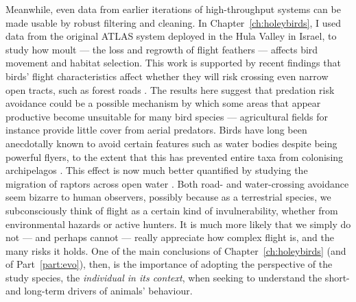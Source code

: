 Meanwhile, even data from earlier iterations of high-throughput systems can be made usable by robust filtering and cleaning.
In Chapter~\ref{ch:holeybirds}, I used data from the original ATLAS system deployed in the Hula Valley in Israel, to study how moult --- the loss and regrowth of flight feathers --- affects bird movement and habitat selection.
This work is supported by recent findings that birds' flight characteristics affect whether they will risk crossing even narrow open tracts, such as forest roads \citep{claramunt2022}.
The results here suggest that predation risk avoidance could be a possible mechanism by which some areas that appear productive become unsuitable for many bird species --- agricultural fields for instance provide little cover from aerial predators.
Birds have long been anecdotally known to avoid certain features such as water bodies despite being powerful flyers, to the extent that this has prevented entire taxa from colonising archipelagos \citep{diamond1981}.
This effect is now much better quantified by studying the migration of raptors across open water \citep{nourani2020}.
Both road- and water-crossing avoidance seem bizarre to human observers, possibly because as a terrestrial species, we subconsciously think of flight as a certain kind of invulnerability, whether from environmental hazards or active hunters.
It is much more likely that we simply do not --- and perhaps cannot --- really appreciate how complex flight is, and the many risks it holds.
One of the main conclusions of Chapter~\ref{ch:holeybirds} (and of Part~\ref{part:evo}), then, is the importance of adopting the perspective of the study species, the \textit{individual in its context}, when seeking to understand the short- and long-term drivers of animals' behaviour.

